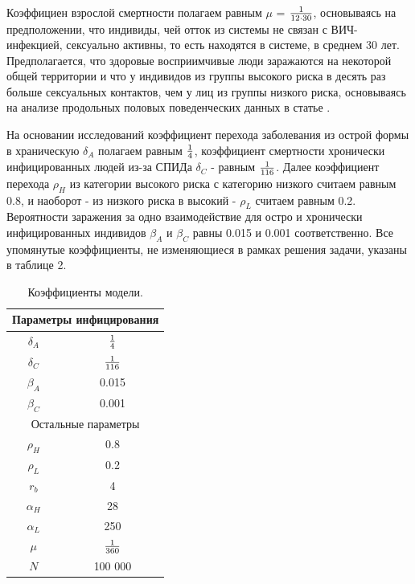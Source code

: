 \documentclass[a4paper]{report}
\begin{document}
	Коэффициен взрослой смертности полагаем равным $\mu$ = ${{1} \over {12 \cdot 30}}$, основываясь на предположении, что индивиды, чей отток из системы не связан с ВИЧ-инфекцией, сексуально активны, то есть находятся в системе, в среднем 30 лет. Предполагается, что здоровые восприимчивые люди заражаются на некоторой общей территории и что у индивидов из группы высокого риска в десять раз больше сексуальных контактов, чем у лиц из группы низкого риска, основываясь на анализе продольных половых поведенческих данных в статье \cite{link23}.
	
	На основании исследований \cite{link20} коэффициент перехода заболевания из острой формы в храническую $\delta_A$ полагаем равным ${{1} \over {4}}$, коэффициент смертности хронически инфицированных людей из-за СПИДа $\delta_C$ - равным ${{1} \over {116}}$. Далее коэффициент перехода $\rho_H$ из категории высокого риска с категорию низкого считаем равным 0.8, и наоборот - из низкого риска в высокий - $\rho_L$ считаем равным 0.2. Вероятности заражения за одно взаимодействие для остро и хронически инфицированных индивидов $\beta_A$ и $\beta_C$ равны 0.015 и 0.001 соответственно. Все упомянутые коэффициенты, не изменяющиеся в рамках решения задачи, указаны в таблице 2.
	
		\begin{table}
		\begin{center}
			\begin{tabular}{c|c}
				
				
				\multicolumn{2}{c}{Параметры инфицирования} \\
				\hline
				$\delta_A$ & ${{1} \over {4}}$ \\
				$\delta_C$ & ${{1} \over {116}}$ \\
				$\beta_A$ & 0.015 \\
				$\beta_C$ &  0.001 \\
				\hline
				
				\multicolumn{2}{c}{Остальные параметры} \\
				\hline
				$\rho_H$ & 0.8 \\
				$\rho_L$ & 0.2 \\
				$r_b$ & 4 \\
				$\alpha_H$ & 28 \\
				$\alpha_L$ & 250 \\
				$\mu$ & ${{1} \over {360}}$ \\
				$N$ & 100 000 \\
				\hline
				
			\end{tabular}
		\end{center}
		\caption{\label{tab:canonsummary}Коэффициенты модели.}
	\end{table}
	
\end{document}
